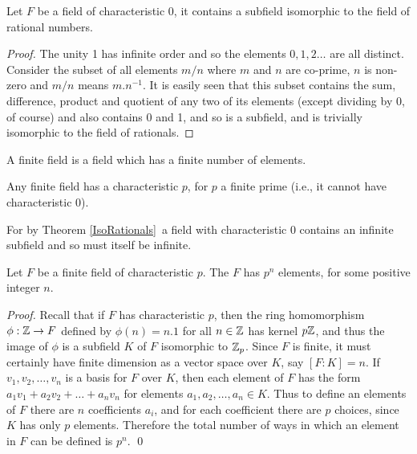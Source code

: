 \begin{theorem}
Let $F$ be a field of characteristic 0, it contains a subfield isomorphic to the field of rational numbers.\label{IsoRationals} 
\end{theorem}

\begin{proof}
The unity 1 has infinite order and so the elements $0,1,2\hdots$ are all distinct. Consider the subset of all elements $m/n$ where $m$ and $n$ are co-prime, $n$ is non-zero and $m/n$ means $m.n^{-1}$. It is easily seen that this subset contains the sum, difference, product and quotient of any two of its elements (except dividing by 0, of course) and also contains 0 and 1, and so is a subfield, and is trivially isomorphic to the field of rationals. 
\end{proof}

\begin{definition}
A finite field is a field which has a finite number of elements. 
\end{definition}

\begin{theorem}
Any finite field has a characteristic $p$, for $p$ a finite prime (i.e., it cannot have characteristic 0).
\end{theorem}
For by Theorem \ref{IsoRationals}\ a field with characteristic 0 contains an infinite subfield and so must itself be infinite. 

\begin{theorem}
Let $F$ be a finite field of characteristic $p$. The $F$ has $p^n$ elements, for some positive integer $n$.\label{FiniteField}
\end{theorem}

\begin{proof}
Recall that if $F$ has characteristic $p$, then the ring homomorphism $\phi: \mathbb{Z} \rightarrow F$ defined by $\phi(n) = n.1$ for all $n\in \mathbb{Z}$ has kernel $p\mathbb{Z}$, and thus the image of $\phi$ is a subfield $K$ of $F$ isomorphic to $\mathbb{Z}_p$. Since $F$ is finite, it must certainly have finite dimension as a vector space over $K$, say $[F:K] = n$. If $v_1, v_2, \hdots, v_n$ is a basis for $F$ over $K$, then each element of $F$ has the form $a_1v_1 + a_2v_2 + \hdots + a_nv_n$ for elements $a_1, a_2, \hdots, a_n \in K$. Thus to define an elements of $F$ there are $n$ coefficients $a_i$, and for each coefficient there are $p$ choices, since $K$ has only $p$ elements. Therefore the total number of ways in which an element in $F$ can be defined is $p^n$. \qed
\end{proof}

